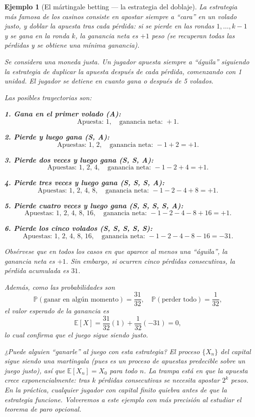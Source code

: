 \documentclass[12pt]{book}
\newtheorem{example}{Ejemplo}[chapter]
\begin{document}
\begin{example}[El mártingale betting — la estrategia del doblaje]
\label{ej:doblaje}
    La estrategia más famosa de los casinos consiste en apostar siempre a ``cara'' en un volado justo, y \emph{doblar la apuesta} tras cada pérdida: si se pierde en las rondas $1, \ldots, k-1$ y se gana en la ronda $k$, la ganancia neta es $+1$ peso (se recuperan todas las pérdidas y se obtiene una mínima ganancia). 

    
Se considera una moneda justa. Un jugador apuesta siempre a “águila” siguiendo la estrategia de duplicar la apuesta después de cada pérdida, comenzando con 1 unidad. El jugador se detiene en cuanto gana o después de 5 volados.

Las posibles trayectorias son:

\medskip

\noindent
\textbf{1. Gana en el primer volado (A):}
\[
\text{Apuesta: } 1, \quad \text{ganancia neta: } +1.
\]

\noindent
\textbf{2. Pierde y luego gana (S, A):}
\[
\text{Apuestas: } 1,\, 2, \quad \text{ganancia neta: } -1 + 2 = +1.
\]

\noindent
\textbf{3. Pierde dos veces y luego gana (S, S, A):}
\[
\text{Apuestas: } 1,\, 2,\, 4, \quad \text{ganancia neta: } -1 -2 + 4 = +1.
\]

\noindent
\textbf{4. Pierde tres veces y luego gana (S, S, S, A):}
\[
\text{Apuestas: } 1,\, 2,\, 4,\, 8, \quad \text{ganancia neta: } -1 -2 -4 + 8 = +1.
\]

\noindent
\textbf{5. Pierde cuatro veces y luego gana (S, S, S, S, A):}
\[
\text{Apuestas: } 1,\, 2,\, 4,\, 8,\, 16, \quad \text{ganancia neta: } -1 -2 -4 -8 + 16 = +1.
\]

\noindent
\textbf{6. Pierde los cinco volados (S, S, S, S, S):}
\[
\text{Apuestas: } 1,\, 2,\, 4,\, 8,\, 16, \quad \text{ganancia neta: } -1 -2 -4 -8 -16 = -31.
\]

\medskip

Obsérvese que en todos los casos en que aparece al menos una “águila”, la ganancia neta es $+1$. Sin embargo, si ocurren cinco pérdidas consecutivas, la pérdida acumulada es $31$.

\medskip

Además, como las probabilidades son
\[
\mathbb{P}(\text{ganar en algún momento}) = \frac{31}{32}, \quad
\mathbb{P}(\text{perder todo}) = \frac{1}{32},
\]
el valor esperado de la ganancia es
\[
\mathbb{E}[X] = \frac{31}{32}(1) + \frac{1}{32}(-31) = 0,
\]
lo cual confirma que el juego sigue siendo justo.


    \smallskip
    ¿Puede alguien ``ganarle'' al juego con esta estrategia? El proceso $\{X_n\}$ del capital sigue siendo una martingala (pues es un proceso de apuestas predecible sobre un juego justo), así que $\mathbb{E}[X_n] = X_0$ para todo $n$. La trampa está en que la apuesta crece exponencialmente: tras $k$ pérdidas consecutivas se necesita apostar $2^k$ pesos. En la práctica, cualquier jugador con capital finito quiebra antes de que la estrategia funcione. Volveremos a este ejemplo con más precisión al estudiar el teorema de paro opcional.
\end{example}
\end{document}
